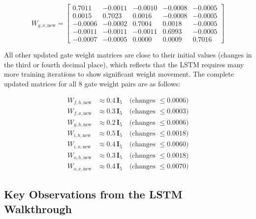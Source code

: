 \begin{equation}
    W_{g,x,\text{new}} = \begin{bmatrix}
     0.7011 & -0.0011 & -0.0010 & -0.0008 & -0.0005 \\
     0.0015 &  0.7023 &  0.0016 & -0.0008 & -0.0005 \\
    -0.0006 & -0.0002 &  0.7004 &  0.0018 & -0.0005 \\
    -0.0011 & -0.0011 & -0.0011 &  0.6993 & -0.0005 \\
    -0.0007 & -0.0005 &  0.0000 &  0.0009 &  0.7016
    \end{bmatrix}
\end{equation}

All other updated gate weight matrices are close to their initial values (changes in
the third or fourth decimal place), which reflects that the LSTM requires many more
training iterations to show significant weight movement. The complete updated matrices
for all 8 gate weight pairs are as follows:

\begin{align*}
    W_{f,h,\text{new}} &\approx 0.4\,\mathbf{I}_5 \quad \text{(changes } \leq 0.0006\text{)} \\
    W_{f,x,\text{new}} &\approx 0.3\,\mathbf{I}_5 \quad \text{(changes } \leq 0.0003\text{)} \\
    W_{g,h,\text{new}} &\approx 0.2\,\mathbf{I}_5 \quad \text{(changes } \leq 0.0006\text{)} \\
    W_{i,h,\text{new}} &\approx 0.5\,\mathbf{I}_5 \quad \text{(changes } \leq 0.0018\text{)} \\
    W_{i,x,\text{new}} &\approx 0.4\,\mathbf{I}_5 \quad \text{(changes } \leq 0.0060\text{)} \\
    W_{o,h,\text{new}} &\approx 0.3\,\mathbf{I}_5 \quad \text{(changes } \leq 0.0018\text{)} \\
    W_{o,x,\text{new}} &\approx 0.4\,\mathbf{I}_5 \quad \text{(changes } \leq 0.0070\text{)}
\end{align*}

\subsection{Key Observations from the LSTM Walkthrough}

